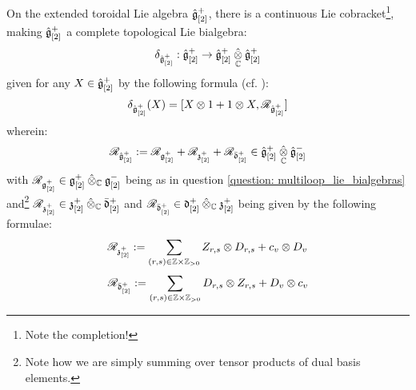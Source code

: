             \begin{corollary} \label{coro: extended_toroidal_lie_bialgebras}
                On the extended toroidal Lie algebra $\hat{\mathfrak{g}}_{[2]}^+$, there is a continuous Lie cobracket\footnote{Note the completion!}, making $\hat{\mathfrak{g}}_{[2]}^+$ a complete topological Lie bialgebra:
                    $$\delta_{\hat{\g}_{[2]}^+}: \hat{\g}_{[2]}^+ \to \hat{\g}_{[2]}^+ \hattensor_{\bbC} \hat{\g}_{[2]}^+$$
                given for any $X \in \hat{\mathfrak{g}}_{[2]}^+$ by the following formula (cf. \cite{etingof_kazhdan_quantisation_1}):
                    $$\delta_{\hat{\g}_{[2]}^+}(X) = [ X \tensor 1 + 1 \tensor X, \scrR_{\hat{\g}_{[2]}^+} ]$$
                wherein:
                    $$\scrR_{\hat{\g}_{[2]}^+} := \scrR_{\g_{[2]}^+} + \scrR_{\z_{[2]}^+} + \scrR_{\bar{\d}_{[2]}^+} \in \hat{\g}_{[2]}^+ \hattensor_{\bbC} \hat{\g}_{[2]}^-$$
                with $\scrR_{\g_{[2]}^+} \in \g_{[2]}^+ \hattensor_{\bbC} \g_{[2]}^-$ being as in question \ref{question: multiloop_lie_bialgebras} and\footnote{Note how we are simply summing over tensor products of dual basis elements.} $\scrR_{\z_{[2]}^+} \in \z_{[2]}^+ \hattensor_{\bbC} \bar{\d}_{[2]}^+$ and $\scrR_{\bar{\d}_{[2]}^+} \in \d_{[2]}^+ \hattensor_{\bbC} \z_{[2]}^+$ being given by the following formulae:
                    $$\scrR_{\z_{[2]}^+} := \sum_{(r, s) \in \Z \x \Z_{> 0}} Z_{r, s} \tensor D_{r, s} + c_v \tensor D_v$$
                    $$\scrR_{\bar{\d}_{[2]}^+} := \sum_{(r, s) \in \Z \x \Z_{> 0}} D_{r, s} \tensor Z_{r, s} + D_v \tensor c_v$$
            \end{corollary}
